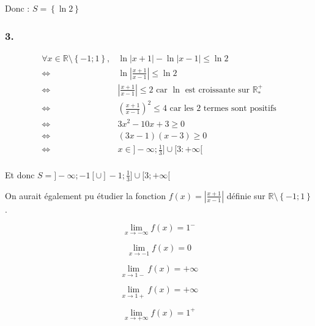 \documentclass[a4paper,10pt]{report}
\begin{document}
Donc : $S=\left\lbrace \ln 2 \right\rbrace$

\subsubsection*{3.}
\begin{equation*}
	\begin{split}
		\forall x \in \mathbb{R} \setminus \left\lbrace -1 ; 1 \right\rbrace, & \ln |x+1| - \ln |x-1| \leq \ln 2 \\
		\Longleftrightarrow & \ln \left| \frac{x+1}{x-1} \right| \leq \ln 2 \\
		\Longleftrightarrow & \left| \frac{x+1}{x-1} \right| \leq 2 \text{ car $\ln$ est croissante sur $\mathbb{R}^{+}_{*}$} \\
		\Longleftrightarrow & \left( \frac{x+1}{x-1} \right)^2 \leq 4 \text{ car les 2 termes sont positifs} \\
		\Longleftrightarrow & 3x^2-10x+3 \geq 0 \\
		\Longleftrightarrow & (3x-1)(x-3) \geq 0 \\
		\Longleftrightarrow & x \in ]-\infty ; \frac{1}{3}] \cup [3 : +\infty[ \\
	\end{split}
\end{equation*}

Et donc $S = ]-\infty ; -1[ \cup ]-1 ; \frac{1}{3}] \cup [3 ; +\infty[$


On aurait également pu étudier la fonction $f(x) = \left| \frac{x+1}{x-1} \right|$ définie sur $\mathbb{R} \setminus \left\lbrace -1 ; 1 \right\rbrace$.

\begin{displaymath}
	\lim_{x \rightarrow -\infty} f(x) = 1^{-}
\end{displaymath}

\begin{displaymath}
	\lim_{x \rightarrow -1} f(x) = 0
\end{displaymath}

\begin{displaymath}
	\lim_{x \rightarrow 1-} f(x) = +\infty
\end{displaymath}

\begin{displaymath}
	\lim_{x \rightarrow 1+} f(x) = +\infty
\end{displaymath}

\begin{displaymath}
	\lim_{x \rightarrow +\infty} f(x) = 1^{+}
\end{displaymath}
\end{document}
